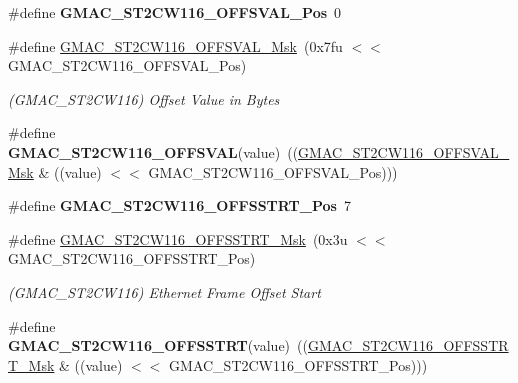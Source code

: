 \begin{DoxyCompactItemize}
\item 
\mbox{\label{group__SAME70__GMAC_ga173ca3ec118fcc6a711ef4c747ca6493}} 
\#define {\bfseries G\+M\+A\+C\+\_\+\+S\+T2\+C\+W116\+\_\+\+O\+F\+F\+S\+V\+A\+L\+\_\+\+Pos}~0
\item 
\mbox{\label{group__SAME70__GMAC_ga38880a28cfeeee7856cdc18be44ae4f7}} 
\#define \mbox{\hyperlink{group__SAME70__GMAC_ga38880a28cfeeee7856cdc18be44ae4f7}{G\+M\+A\+C\+\_\+\+S\+T2\+C\+W116\+\_\+\+O\+F\+F\+S\+V\+A\+L\+\_\+\+Msk}}~(0x7fu $<$$<$ G\+M\+A\+C\+\_\+\+S\+T2\+C\+W116\+\_\+\+O\+F\+F\+S\+V\+A\+L\+\_\+\+Pos)
\begin{DoxyCompactList}\small\item\em (G\+M\+A\+C\+\_\+\+S\+T2\+C\+W116) Offset Value in Bytes \end{DoxyCompactList}\item 
\mbox{\label{group__SAME70__GMAC_ga434a2fc0c8ff46743670a98735e019a3}} 
\#define {\bfseries G\+M\+A\+C\+\_\+\+S\+T2\+C\+W116\+\_\+\+O\+F\+F\+S\+V\+AL}(value)~((\mbox{\hyperlink{group__SAMV71__GMAC_ga38880a28cfeeee7856cdc18be44ae4f7}{G\+M\+A\+C\+\_\+\+S\+T2\+C\+W116\+\_\+\+O\+F\+F\+S\+V\+A\+L\+\_\+\+Msk}} \& ((value) $<$$<$ G\+M\+A\+C\+\_\+\+S\+T2\+C\+W116\+\_\+\+O\+F\+F\+S\+V\+A\+L\+\_\+\+Pos)))
\item 
\mbox{\label{group__SAME70__GMAC_gadace1572904d7981902fdfc18147015f}} 
\#define {\bfseries G\+M\+A\+C\+\_\+\+S\+T2\+C\+W116\+\_\+\+O\+F\+F\+S\+S\+T\+R\+T\+\_\+\+Pos}~7
\item 
\mbox{\label{group__SAME70__GMAC_ga7e3cd1a1eca0a38d2e09c10584b5be36}} 
\#define \mbox{\hyperlink{group__SAME70__GMAC_ga7e3cd1a1eca0a38d2e09c10584b5be36}{G\+M\+A\+C\+\_\+\+S\+T2\+C\+W116\+\_\+\+O\+F\+F\+S\+S\+T\+R\+T\+\_\+\+Msk}}~(0x3u $<$$<$ G\+M\+A\+C\+\_\+\+S\+T2\+C\+W116\+\_\+\+O\+F\+F\+S\+S\+T\+R\+T\+\_\+\+Pos)
\begin{DoxyCompactList}\small\item\em (G\+M\+A\+C\+\_\+\+S\+T2\+C\+W116) Ethernet Frame Offset Start \end{DoxyCompactList}\item 
\mbox{\label{group__SAME70__GMAC_gaac9aabcc977dfcaf9f4c7b5da993879f}} 
\#define {\bfseries G\+M\+A\+C\+\_\+\+S\+T2\+C\+W116\+\_\+\+O\+F\+F\+S\+S\+T\+RT}(value)~((\mbox{\hyperlink{group__SAMV71__GMAC_ga7e3cd1a1eca0a38d2e09c10584b5be36}{G\+M\+A\+C\+\_\+\+S\+T2\+C\+W116\+\_\+\+O\+F\+F\+S\+S\+T\+R\+T\+\_\+\+Msk}} \& ((value) $<$$<$ G\+M\+A\+C\+\_\+\+S\+T2\+C\+W116\+\_\+\+O\+F\+F\+S\+S\+T\+R\+T\+\_\+\+Pos)))

\end{DoxyCompactItemize}
